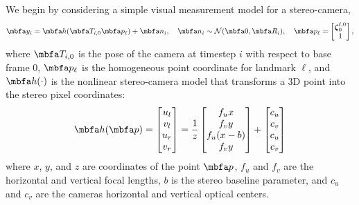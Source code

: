 \documentclass[10pt,letterpaper,fleqn,oneside]{article}
\begin{document}
We begin by considering a simple visual measurement model for a stereo-camera,
%
\begin{equation}
\mbf{y}_i = \mbf{h}(\mbf{T}_{i,0} \mbf{p}_\ell) + \mbf{n}_i, \quad 
\mbf{n}_i \sim \N(\mbf{0}, \mbf{R}_i), \quad
\mbf{p}_\ell = \bbm \mbs{\zeta}_0^{\ell,0} \\ 1 \ebm,
\end{equation}
%
where $\mbf{T}_{i,0}$ is the pose of the camera at timestep $i$ with respect to base frame $0$, $\mbf{p}_\ell$ is the homogeneous point coordinate for landmark $\ell$, and $\mbf{h}(\cdot)$ is the nonlinear stereo-camera model that transforms a 3D point into the stereo pixel coordinates:
%
\begin{equation}
\mbf{h}(\mbf{p}) 
= \bbm u_l \\ v_l \\ u_r \\ v_r \ebm
= \frac{1}{z} \bbm f_u x \\ f_v y \\ f_u (x-b) \\ f_v y \ebm 
  + \bbm c_u \\ c_v \\ c_u \\ c_v \ebm
\end{equation}
%
where $x$, $y$, and $z$ are coordinates of the point $\mbf{p}$, $f_u$ and $f_v$ are the horizontal and vertical focal lengths, $b$ is the stereo baseline parameter, and $c_u$ and $c_v$ are the cameras horizontal and vertical optical centers.
\end{document}
